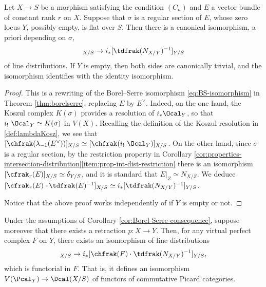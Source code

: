 \begin{corollary}\label{cor:Borel-Serre-consequence}
Let $X\to S$ be a morphism satisfying the condition $(C_n)$ and $E$ a vector bundle of constant rank $r$ on $X$. Suppose that $\sigma$ is a regular section of $E$, whose zero locus $Y$, possibly empty, is flat over $S$. Then there is a canonical isomorphism, a priori depending on $\sigma$,\vspace*{-3pt}
\begin{displaymath}
[\chfrak(i_! \ \Ocal_Y)]_{X/S} \to i_\ast [\tdfrak(N_{X/Y})^{-1}]_{Y/S}
\end{displaymath}
of line distributions. If $Y$ is empty, then both sides are canonically trivial, and the isomorphism identifies with the identity isomorphism.

\end{corollary}

\begin{proof}
This is a rewriting of the Borel--Serre isomorphism \eqref{eq:BS-isomorphism} in Theorem \ref{thm:borelserre}, replacing $E$ by $E^\vee$. Indeed, on the one hand, the Koszul complex $K(\sigma)$ provides a resolution of $i_{\ast}\Ocal_{Y}$, so that $i_{!}\ \Ocal_{Y}\simeq K(\sigma)$ in $V(X)$. Recalling the definition of the Koszul resolution in \eqref{def:lambdaKosz}, we see that $[\chfrak(\lambda_{-1}(E^{\vee}))]_{X/S}\simeq [\chfrak(i_{!}\ \Ocal_{Y})]_{X/S}$. On the other hand, since $\sigma$ is a regular section, by the restriction property in Corollary \ref{cor:properties-intersection-distribution}\eqref{item:prop-int-dist-restriction} there is an isomorphism $[\cfrak_r(E)]_{X/S} \simeq \delta_{Y/S}$, and it is standard that $E|_{Z} \simeq N_{X/Z}$. We deduce $[\cfrak_{r}(E)\cdot\tdfrak(E)^{-1}]_{X/S}\simeq i_{\ast}[\tdfrak(N_{X/Y})^{-1}]_{Y/S}$.

Notice that the above proof works independently of if $Y$ is empty or not.
\end{proof}

\begin{corollary}\label{cor:Borel-Serre-consequence2}
Under the assumptions of Corollary \ref{cor:Borel-Serre-consequence}, suppose moreover that there exists a retraction $p\colon X\to Y$. Then, for any virtual perfect complex $F$ on $Y$, there exists an isomorphism of line distributions\vspace*{-3pt}
\begin{displaymath}
[\chfrak(i_!\ F)]_{X/S} \to i_\ast [\chfrak(F) \cdot \tdfrak(N_{X/Y})^{-1}]_{Y/S},
\end{displaymath}
which is functorial in $F$. That is, it defines an isomorphism $V(\Pcal_{Y})\to\Dcal(X/S)$ of functors of commutative Picard categories.
\end{corollary}

